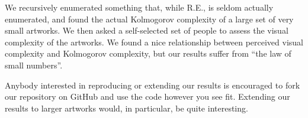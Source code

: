 \documentclass[11pt]{article}
\begin{document}
We recursively enumerated something that, while R.E., is seldom actually
enumerated, and found the actual Kolmogorov complexity of a large set of very
small artworks.  We then asked a self-selected set of people to assess the
visual complexity of the artworks.  We found a nice relationship between
perceived visual complexity and Kolmogorov complexity, but our results suffer
from ``the law of small numbers''\cite{smallnumbers}.

Anybody interested in reproducing or extending our results is encouraged to
fork our repository on GitHub and use the code however you see fit.  Extending
our results to larger artworks would, in particular, be quite interesting.  
\end{document}
